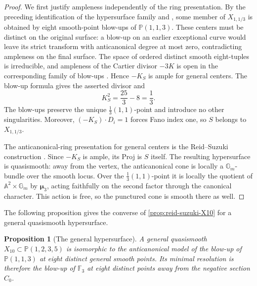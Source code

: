 \documentclass[11pt]{article}
\theoremstyle{plain}
\newtheorem{proposition}[proposition]{Proposition}
\theoremstyle{definition}
\theoremstyle{remark}
\newcommand{\A}{\mathbb A}
\newcommand{\Pp}{\mathbb P}
\newcommand{\F}{\mathbb F}
\newcommand{\muthree}{\boldsymbol{\mu}_3}
\begin{document}
\begin{proof}
We first justify ampleness independently of the ring
presentation. By the preceding identification of the hypersurface family and
\cite[Corollary~8(1)]{Corti2016}, some member of \(X_{1,1/3}\) is obtained
by eight smooth-point blow-ups of \(\Pp(1,1,3)\). These centers must be
distinct on the original surface: a blow-up on an earlier exceptional
curve would leave its strict transform with anticanonical degree at most
zero, contradicting ampleness on the final surface. The space of ordered
distinct smooth eight-tuples is irreducible, and ampleness of the Cartier
divisor \(-3K\) is open in the corresponding family of blow-ups
\cite[Tag~0D2S]{StacksProject}. Hence
\(-K_S\) is ample for general centers. The blow-up formula gives the
asserted divisor and
\[
K_S^2=\frac{25}{3}-8=\frac13.
\]
The blow-ups preserve the unique \(\frac13(1,1)\)-point and introduce no
other singularities. Moreover, \((-K_S)\cdot D_i=1\) forces Fano index
one, so \(S\) belongs to \(X_{1,1/3}\).

The anticanonical-ring presentation for general centers is the
Reid--Suzuki construction \cite[Section~1 and Table~1.1]{ReidSuzuki2004}.
Since \(-K_S\) is ample, its Proj is \(S\) itself. The resulting hypersurface
is quasismooth: away from the vertex, the anticanonical cone is locally a
\(\mathbb G_m\)-bundle over the smooth locus. Over the
\(\frac13(1,1)\)-point it is locally the quotient of
\(\A^2\times\mathbb G_m\) by \(\muthree\), acting faithfully on the second
factor through the canonical character. This action is free, so the
punctured cone is smooth there as well.
\end{proof}

The following proposition gives the converse of \cref{prop:reid-suzuki-X10}
for a general quasismooth hypersurface.

\begin{proposition}[The general hypersurface]
\label{prop:general-X10}
A general quasismooth
\(X_{10}\subset\Pp(1,2,3,5)\) is isomorphic to the anticanonical model of
the blow-up of \(\Pp(1,1,3)\) at eight distinct general smooth points.
Its minimal resolution is therefore the blow-up of \(\F_3\) at eight
distinct points away from the negative section \(C_0\).
\end{proposition}
\end{document}
